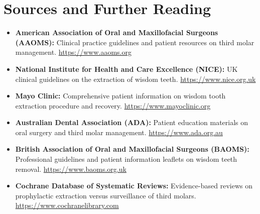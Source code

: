 \section*{Sources and Further Reading}
\begin{itemize}
    \item \textbf{American Association of Oral and Maxillofacial Surgeons (AAOMS):} Clinical practice guidelines and patient resources on third molar management. \url{https://www.aaoms.org}
    \item \textbf{National Institute for Health and Care Excellence (NICE):} UK clinical guidelines on the extraction of wisdom teeth. \url{https://www.nice.org.uk}
    \item \textbf{Mayo Clinic:} Comprehensive patient information on wisdom tooth extraction procedure and recovery. \url{https://www.mayoclinic.org}
    \item \textbf{Australian Dental Association (ADA):} Patient education materials on oral surgery and third molar management. \url{https://www.ada.org.au}
    \item \textbf{British Association of Oral and Maxillofacial Surgeons (BAOMS):} Professional guidelines and patient information leaflets on wisdom teeth removal. \url{https://www.baoms.org.uk}
    \item \textbf{Cochrane Database of Systematic Reviews:} Evidence-based reviews on prophylactic extraction versus surveillance of third molars. \url{https://www.cochranelibrary.com}
\end{itemize}